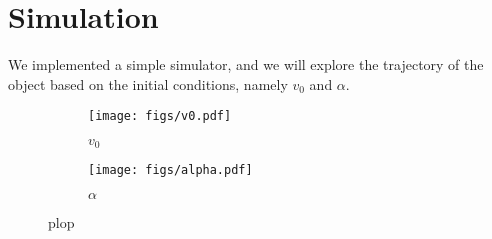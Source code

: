 \documentclass{article}
\begin{document}
\section{Simulation}

We implemented a simple simulator, and we will explore the trajectory of the object based on the initial conditions, namely $v_0$ and $\alpha$.


\begin{figure}
    \centering
    \begin{subfigure}{0.45\textwidth}
        \texttt{[image: figs/v0.pdf]}
        \caption{$v_0$}
    \end{subfigure}
    \begin{subfigure}{0.45\textwidth}
        \texttt{[image: figs/alpha.pdf]}
        \caption{$\alpha$}
    \end{subfigure}
    \caption{plop}
\end{figure}
\end{document}
